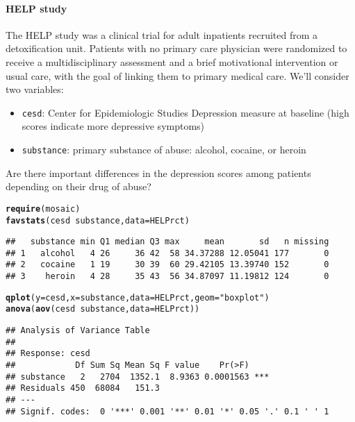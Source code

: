 \documentclass[10pt]{article}\usepackage[]{graphicx}\usepackage[]{color}
\makeatletter
\newcommand{\hlstr}[1]{\textcolor[rgb]{0.192,0.494,0.8}{#1}}%
\newcommand{\hlopt}[1]{\textcolor[rgb]{0,0,0}{#1}}%
\newcommand{\hlstd}[1]{\textcolor[rgb]{0.345,0.345,0.345}{#1}}%
\newcommand{\hlkwc}[1]{\textcolor[rgb]{0.333,0.667,0.333}{#1}}%
\newcommand{\hlkwd}[1]{\textcolor[rgb]{0.737,0.353,0.396}{\textbf{#1}}}%
\newenvironment{kframe}{%
 \def\at@end@of@kframe{}%
 \ifinner\ifhmode%
  \def\at@end@of@kframe{\end{minipage}}%
  \begin{minipage}{\columnwidth}%
 \fi\fi%
 \def\FrameCommand##1{\hskip\@totalleftmargin \hskip-\fboxsep
 \colorbox{shadecolor}{##1}\hskip-\fboxsep
     \hskip-\linewidth \hskip-\@totalleftmargin \hskip\columnwidth}%
 \MakeFramed {\advance\hsize-\width
   \@totalleftmargin\z@ \linewidth\hsize
   \@setminipage}}%
 {\par\unskip\endMakeFramed%
 \at@end@of@kframe}
\newenvironment{knitrout}{}{} %
\newcommand{\cmd}[1]{\texttt{#1}}
\makeatother
\begin{document}
\paragraph{HELP study}

The HELP study was a clinical trial for adult inpatients recruited from a detoxification unit. Patients with no primary care physician were randomized to receive a multidisciplinary assessment and a brief motivational intervention or usual care, with the goal of linking them to primary medical care. We'll consider two variables:

\begin{itemize}
  \itemsep0in
  \item \cmd{cesd}: Center for Epidemiologic Studies Depression measure at baseline (high scores indicate more depressive symptoms)
  \item \cmd{substance}: primary substance of abuse: alcohol, cocaine, or heroin
\end{itemize}

Are there important differences in the depression scores among patients depending on their drug of abuse? 
\clearpage
\begin{knitrout}\footnotesize
{}\color{fgcolor}\begin{kframe}
\begin{alltt}
\hlkwd{require}\hlstd{(mosaic)}
\hlkwd{favstats}\hlstd{(cesd} \hlopt{~} \hlstd{substance,} \hlkwc{data} \hlstd{= HELPrct)}
\end{alltt}
\begin{verbatim}
##   substance min Q1 median Q3 max     mean       sd   n missing
## 1   alcohol   4 26     36 42  58 34.37288 12.05041 177       0
## 2   cocaine   1 19     30 39  60 29.42105 13.39740 152       0
## 3    heroin   4 28     35 43  56 34.87097 11.19812 124       0
\end{verbatim}
\begin{alltt}
\hlkwd{qplot}\hlstd{(}\hlkwc{y} \hlstd{= cesd,} \hlkwc{x} \hlstd{= substance,} \hlkwc{data} \hlstd{= HELPrct,} \hlkwc{geom} \hlstd{=} \hlstr{"boxplot"}\hlstd{)}
\hlkwd{anova}\hlstd{(}\hlkwd{aov}\hlstd{(cesd} \hlopt{~} \hlstd{substance,} \hlkwc{data} \hlstd{= HELPrct))}
\end{alltt}
\begin{verbatim}
## Analysis of Variance Table
## 
## Response: cesd
##            Df Sum Sq Mean Sq F value    Pr(>F)    
## substance   2   2704  1352.1  8.9363 0.0001563 ***
## Residuals 450  68084   151.3                      
## ---
## Signif. codes:  0 '***' 0.001 '**' 0.01 '*' 0.05 '.' 0.1 ' ' 1
\end{verbatim}
\end{kframe}
\end{knitrout}
\end{document}
